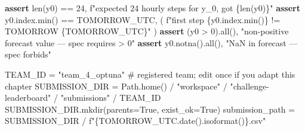 \documentclass[
  english,
  letterpaper,
]{scrbook}
\newenvironment{Shaded}{\begin{snugshade}}{\end{snugshade}}
\newcommand{\BuiltInTok}[1]{\textcolor[rgb]{0.00,0.23,0.31}{#1}}
\newcommand{\CommentTok}[1]{\textcolor[rgb]{0.37,0.37,0.37}{#1}}
\newcommand{\ControlFlowTok}[1]{\textcolor[rgb]{0.00,0.23,0.31}{\textbf{#1}}}
\newcommand{\DecValTok}[1]{\textcolor[rgb]{0.68,0.00,0.00}{#1}}
\newcommand{\NormalTok}[1]{\textcolor[rgb]{0.00,0.23,0.31}{#1}}
\newcommand{\OperatorTok}[1]{\textcolor[rgb]{0.37,0.37,0.37}{#1}}
\newcommand{\SpecialCharTok}[1]{\textcolor[rgb]{0.37,0.37,0.37}{#1}}
\newcommand{\SpecialStringTok}[1]{\textcolor[rgb]{0.13,0.47,0.30}{#1}}
\newcommand{\StringTok}[1]{\textcolor[rgb]{0.13,0.47,0.30}{#1}}
\newcommand{\VariableTok}[1]{\textcolor[rgb]{0.07,0.07,0.07}{#1}}
\begin{document}
\begin{Shaded}
\begin{Highlighting}[]
\ControlFlowTok{assert} \BuiltInTok{len}\NormalTok{(y0) }\OperatorTok{==} \DecValTok{24}\NormalTok{,           }\SpecialStringTok{f"expected 24 hourly steps for y\_0, got }\SpecialCharTok{\{}\BuiltInTok{len}\NormalTok{(y0)}\SpecialCharTok{\}}\SpecialStringTok{"}
\ControlFlowTok{assert}\NormalTok{ y0.index.}\BuiltInTok{min}\NormalTok{() }\OperatorTok{==}\NormalTok{ TOMORROW\_UTC, (}
    \SpecialStringTok{f"first step }\SpecialCharTok{\{}\NormalTok{y0}\SpecialCharTok{.}\NormalTok{index}\SpecialCharTok{.}\BuiltInTok{min}\NormalTok{()}\SpecialCharTok{\}}\SpecialStringTok{ != TOMORROW }\SpecialCharTok{\{}\NormalTok{TOMORROW\_UTC}\SpecialCharTok{\}}\SpecialStringTok{"}
\NormalTok{)}
\ControlFlowTok{assert}\NormalTok{ (y0 }\OperatorTok{\textgreater{}} \DecValTok{0}\NormalTok{).}\BuiltInTok{all}\NormalTok{(),          }\StringTok{"non{-}positive forecast value — spec requires \textgreater{} 0"}
\ControlFlowTok{assert}\NormalTok{ y0.notna().}\BuiltInTok{all}\NormalTok{(),        }\StringTok{"NaN in forecast — spec forbids"}

\NormalTok{TEAM\_ID }\OperatorTok{=} \StringTok{"team\_4\_optuna"}       \CommentTok{\# registered team; edit once if you adapt this chapter}
\NormalTok{SUBMISSION\_DIR }\OperatorTok{=}\NormalTok{ Path.home() }\OperatorTok{/} \StringTok{"workspace"} \OperatorTok{/} \StringTok{"challenge{-}leaderboard"} \OperatorTok{/} \StringTok{"submissions"} \OperatorTok{/}\NormalTok{ TEAM\_ID}
\NormalTok{SUBMISSION\_DIR.mkdir(parents}\OperatorTok{=}\VariableTok{True}\NormalTok{, exist\_ok}\OperatorTok{=}\VariableTok{True}\NormalTok{)}
\NormalTok{submission\_path }\OperatorTok{=}\NormalTok{ SUBMISSION\_DIR }\OperatorTok{/} \SpecialStringTok{f"}\SpecialCharTok{\{}\NormalTok{TOMORROW\_UTC}\SpecialCharTok{.}\NormalTok{date()}\SpecialCharTok{.}\NormalTok{isoformat()}\SpecialCharTok{\}}\SpecialStringTok{.csv"}


\end{Highlighting}
\end{Shaded}
\end{document}
